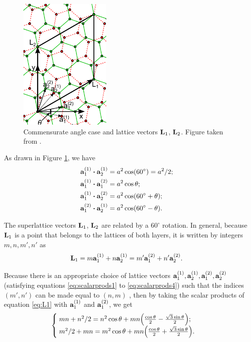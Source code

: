 \documentclass[12pt]{report}
\begin{document}
\begin{figure}[H]
\centering
\includegraphics[width=0.4\textwidth]{fig/tbg/latvec.png}
\caption{Commensurate angle case and lattice vectors $\vb{L}_1$, $\vb{L}_2$. Figure taken from \cite{koshino2012}.}
\label{fig:latvec}
\end{figure}

As drawn in Figure \ref{fig:latvec}, we have
\begin{align}
\label{eq:scalarprods1}
\vb{a}_1^{(1)} \vdot \vb{a}_2^{(1)} &= a^2 \cos(60^\circ) = a^2/2; \\
\label{eq:scalarprods2}
\vb{a}_1^{(1)} \vdot \vb{a}_1^{(2)} &= a^2 \cos\theta; \\
\label{eq:scalarprods3}
\vb{a}_1^{(1)} \vdot \vb{a}_2^{(2)} &= a^2 \cos(60^\circ + \theta); \\
\label{eq:scalarprods4}
\vb{a}_1^{(2)} \vdot \vb{a}_2^{(1)} &= a^2 \cos(60^\circ - \theta).
\end{align}

The superlattice vectors $\vb{L}_1$, $\vb{L}_2$ are related by a $60^\circ$ rotation. In general, because $\vb{L}_1$ is a point that belongs to the lattices of both layers, it is written by integers $m,n,m',n'$ as
\begin{equation} \label{eq:L1}
\vb{L}_1 = m\vb{a}_1^{(1)} + n\vb{a}_2^{(1)} = m'\vb{a}_1^{(2)} + n'\vb{a}_2^{(2)}.
\end{equation}

Because there is an appropriate choice of lattice vectors $\vb{a}_1^{(1)}, \vb{a}_2^{(1)}, \vb{a}_1^{(2)}, \vb{a}_2^{(2)}$ (satisfying equations \ref{eq:scalarprods1} to \ref{eq:scalarprods4}) such that the indices $(m',n')$ can be made equal to $(n,m)$ \cite{koshino2012}, then by taking the scalar products of equation \ref{eq:L1} with $\vb{a}_1^{(1)}$ and $\vb{a}_1^{(2)}$, we get
\begin{equation} \label{eq:mn-system}
\begin{cases}
\; mn + n^2/2 = n^2 \cos\theta + mn \qty(\frac{\cos\theta}{2}
- \frac{\sqrt{3} \sin\theta}{2}); \\
\; m^2/2 + mn = m^2 \cos\theta + mn \qty(\frac{\cos\theta}{2}
+ \frac{\sqrt{3} \sin\theta}{2}).
\end{cases}
\end{equation}
\end{document}
